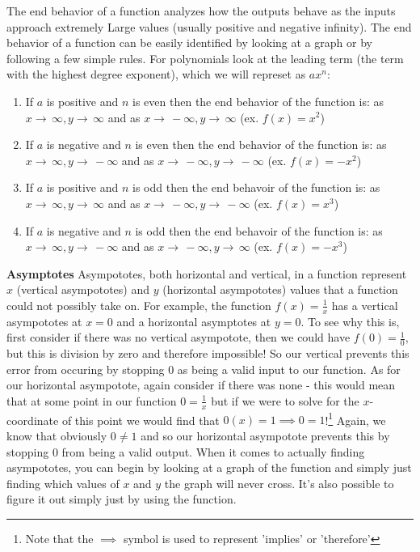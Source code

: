 \documentclass[addpoints]{exam}
\begin{document}
\begin{tcolorbox}[breakable, title=GENERAL FUNCTIONS, colframe=black, sharp corners, colback=white, colbacktitle=white, coltitle=black]
  \newline\normalsize The end behavior of a function analyzes how the outputs behave as the inputs approach extremely Large values (usually positive and negative infinity). The end behavior of a function can be easily identified by looking at a graph or by following a few simple rules. For polynomials look at the leading term (the term with the highest degree exponent), which we will represet as $ax^n$: 
  \begin{enumerate}
    \item If $a$ is positive and $n$ is even then the end behavior of the function is: as $x\to\,\infty, y\to\,\infty$ and as $x\to\,-\infty, y\to\,\infty$ (ex. $f(x)=x^2$)
    \item If $a$ is negative and $n$ is even then the end behavior of the function is: as $x\to\,\infty, y\to\,-\infty$ and as $x\to\,-\infty, y\to\,-\infty$ (ex. $f(x)=-x^2$)
    \item If $a$ is positive and $n$ is odd then the end behavoir of the function is: as $x\to\,\infty, y\to\,\infty$ and as $x\to\,-\infty, y\to\,-\infty$ (ex. $f(x)=x^3$)
    \item If $a$ is negative and $n$ is odd then the end behavoir of the function is: as $x\to\,\infty, y\to\,-\infty$ and as $x\to\,-\infty, y\to\,\infty$ (ex. $f(x)=-x^3$)
  \end{enumerate}
  \vspace{0.1in}
  \Large\textbf{Asymptotes}
  \newline\normalsize Asympototes, both horizontal and vertical, in a function represent $x$ (vertical asympototes) and $y$ (horizontal asympototes) values that a function could not possibly take on. For example, the function $f(x)=\frac{1}{x}$ has a vertical asympototes at $x=0$ and a horizontal asymptotes at $y=0$. To see why this is, first consider if there was no vertical asympotote, then we could have $f(0)=\frac{1}{0}$, but this is division by zero and therefore impossible! So our vertical prevents this error from occuring by stopping $0$ as being a valid input to our function. As for our horizontal asympotote, again consider if there was none - this would mean that at some point in our function $0=\frac{1}{x}$ but if we were to solve for the $x$-coordinate of this point we would find that $0(x)=1 \implies 0=1$!\footnote{Note that the $\implies$ symbol is used to represent 'implies' or 'therefore'} Again, we know that obviously $0 \ne 1$ and so our horizontal asympotote prevents this by stopping $0$ from being a valid output. When it comes to actually finding asympototes, you can begin by looking at a graph of the function and simply just finding which values of $x$ and $y$ the graph will never cross. It's also possible to figure it out simply just by using the function. 

\end{tcolorbox}
\end{document}
